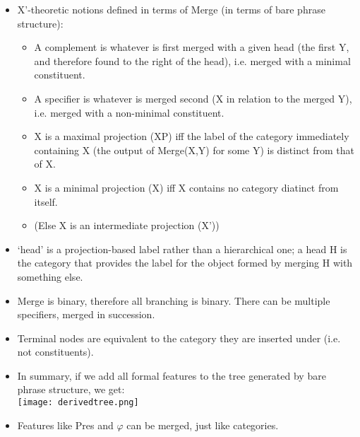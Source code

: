 \documentclass{article}
\begin{document}
\begin{itemize}
    \item X'-theoretic notions defined in terms of Merge (in terms of bare phrase structure):
    \begin{itemize}
        \item A complement is whatever is first merged with a given head (the first Y, and therefore found to the right of the head), i.e. merged with a minimal constituent.
        \item A specifier is whatever is merged second (X in relation to the merged Y), i.e. merged with a non-minimal constituent.
        \item X is a maximal projection (XP) iff the label of the category immediately containing X (the output of Merge(X,Y) for some Y) is distinct from that of X.
        \item X is a minimal projection (X) iff X contains no category diatinct from itself.
        \item (Else X is an intermediate projection (X'))
    \end{itemize}
    \item `head' is a projection-based label rather than a hierarchical one; a head H is the category that provides the label for the object formed by merging H with something else.
    \item Merge is binary, therefore all branching is binary. There can be multiple specifiers, merged in succession.
    \item Terminal nodes are equivalent to the category they are inserted under (i.e. not constituents).
    \item In summary, if we add all formal features to the tree generated by bare phrase structure, we get: \\
    \texttt{[image: derivedtree.png]}
    \item Features like Pres and $\varphi$ can be merged, just like categories.

\end{itemize}
\end{document}
